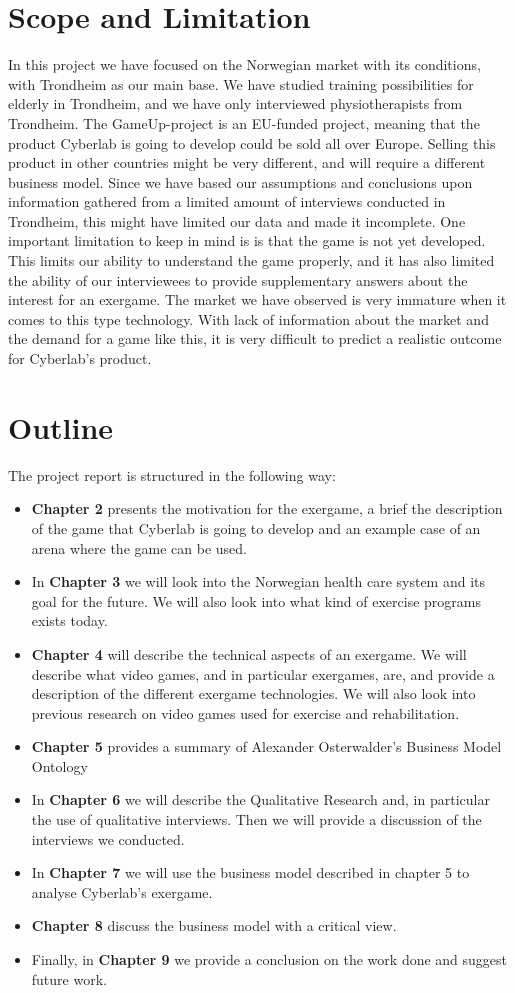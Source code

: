 \section{Scope and Limitation}
In this project we have focused on the Norwegian market with its conditions, with Trondheim as our main base. We have studied training possibilities for elderly in Trondheim, and we have only interviewed physiotherapists from Trondheim. The GameUp-project is an EU-funded project, meaning that the product Cyberlab is going to develop could be sold all over Europe.  Selling this product in other countries might be very different, and will require a different business model. Since we have based our assumptions and conclusions upon information gathered from a limited amount of interviews conducted in Trondheim, this might have limited our data and made it incomplete. One important limitation to keep in mind is is that the game is not yet developed. This limits our ability to understand the game properly, and it has also limited the ability of our interviewees to provide supplementary answers about the interest for an exergame.  The market we have observed is very immature when it comes to this type technology. With lack of information about the market and the demand for a game like this, it is very difficult to predict a realistic outcome for Cyberlab’s product.

\section{Outline}
The project report is structured in the following way:
\begin{itemize}
\renewcommand{\labelitemi}{$\bullet$}
\item \textbf{Chapter 2} presents the motivation for the exergame, a brief the description of the game that Cyberlab is going to develop and an example case of an arena where the game can be used.
\item In \textbf{Chapter 3} we will look into the Norwegian health care system and its goal for the future. We will also look into what kind of exercise programs exists today.
\item	\textbf{Chapter 4} will describe the technical aspects of an exergame. We will describe what video games, and in particular exergames, are, and provide a description of the different exergame technologies. We will also look into previous research on video games used for exercise and rehabilitation.
\item	\textbf{Chapter 5} provides a summary of Alexander Osterwalder's Business Model Ontology
\item	In \textbf{Chapter 6} we will describe the Qualitative Research and, in particular the use of qualitative interviews. Then we will provide a discussion of the interviews we conducted.
\item In \textbf{Chapter 7} we will use the business model described in chapter 5 to analyse Cyberlab's exergame.
\item  \textbf{Chapter 8} discuss the business model with a critical view.
\item Finally, in \textbf{Chapter 9} we provide a conclusion on the work done and suggest future work.
\end{itemize}